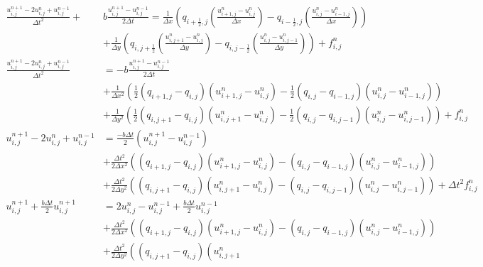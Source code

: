\documentclass[10pt, a4paper]{amsart}
\numberwithin{figure}{section}
\numberwithin{table}{section}
\begin{document}
\begin{align*}
\frac{u_{i,j}^{n+1}-2u_{i,j}^n+u_{i,j}^{n-1}}{\Delta t^2} + & b
\frac{u_{i,j}^{n+1}-u_{i,j}^{n-1}}{2\Delta t} = \frac{1}{\Delta x}
\left(q_{i+\frac{1}{2},j} \left( \frac{u_{i+1,j}^n - u_{i,j}^n}{\Delta x}\right)
    - q_{i-\frac{1}{2},j} \left( \frac{u_{i,j}^n - u_{i-1,j}^n}{\Delta x}\right)\right) \\
    & + \frac{1}{\Delta y} \left( q_{i,j+\frac{1}{2}} \left( \frac{u_{i,j+1}^n 
    - u_{i,j}^n}{\Delta y} \right) - q_{i,j-\frac{1}{2}} \left( \frac{u_{i,j}^n
    - u_{i,j-1}^n}{\Delta y}\right)\right) + f_{i,j}^n \\
\frac{u_{i,j}^{n+1}-2u_{i,j}^n+u_{i,j}^{n-1}}{\Delta t^2} &= - b
\frac{u_{i,j}^{n+1}-u_{i,j}^{n-1}}{2\Delta t} \\ & + \frac{1}{\Delta x^2} \left(
        \frac{1}{2}\left( q_{i+1,j} - q_{i,j} \right) \left(u_{i+1,j}^n 
        - u_{i,j}^n \right) - \frac{1}{2}  \left(q_{i,j}-q_{i-1,j} \right)
        \left( u_{i,j}^n - u_{i-1,j}^n \right)\right) \\
        &+ \frac{1}{\Delta y^2} \left(
        \frac{1}{2}\left( q_{i,j+1} - q_{i,j} \right) \left(u_{i,j+1}^n 
        - u_{i,j}^n \right) - \frac{1}{2} \left(q_{i,j}-q_{i,j-1} \right)
        \left( u_{i,j}^n - u_{i,j-1}^n \right)\right) + f_{i,j}^n \\
u_{i,j}^{n+1}-2u_{i,j}^n+u_{i,j}^{n-1} &=  \frac{-b \Delta t}{2} (u_{i,j}^{n+1}-u_{i,j}^{n-1}) \\
        &+\frac{\Delta t^2}{2 \Delta x^2} \left(
        \left( q_{i+1,j} - q_{i,j} \right) \left(u_{i+1,j}^n 
        - u_{i,j}^n \right) - \left(q_{i,j}-q_{i-1,j} \right)
        \left( u_{i,j}^n - u_{i-1,j}^n \right)\right) \\
        &+ \frac{\Delta t^2}{2 \Delta y^2} \left(
        \left( q_{i,j+1} - q_{i,j} \right) \left(u_{i,j+1}^n 
        - u_{i,j}^n \right) - \left(q_{i,j}-q_{i,j-1} \right)
        \left( u_{i,j}^n - u_{i,j-1}^n \right)\right) + \Delta t^2f_{i,j}^n \\
u_{i,j}^{n+1} + \frac{b \Delta t}{2}u_{i,j}^{n+1} &= 2u_{i,j}^n-u_{i,j}^{n-1}
+ \frac{b \Delta t}{2}u_{i,j}^{n-1} \\
 &+\frac{\Delta t^2}{2 \Delta x^2} \left(
        \left( q_{i+1,j} - q_{i,j} \right) \left(u_{i+1,j}^n 
        - u_{i,j}^n \right) - \left(q_{i,j}-q_{i-1,j} \right)
        \left( u_{i,j}^n - u_{i-1,j}^n \right)\right) \\
        &+ \frac{\Delta t^2}{2 \Delta y^2} \left(
        \left( q_{i,j+1} - q_{i,j} \right) \left(u_{i,j+1}^n 

\end{align*}
\end{document}
